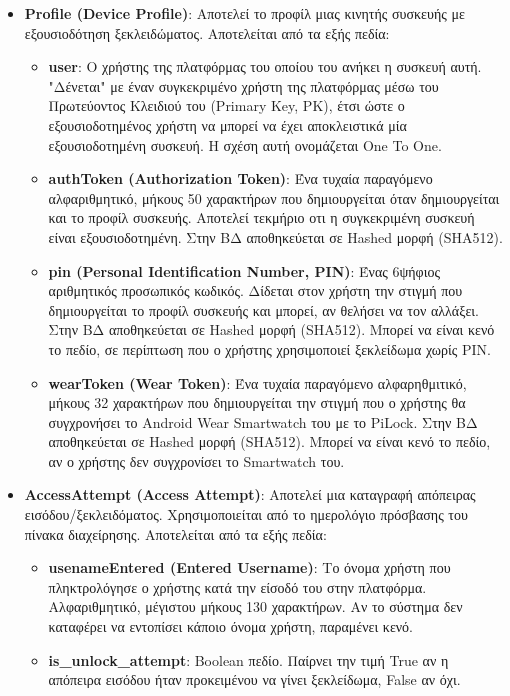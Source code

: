 	\begin{itemize}
		\item \textbf{Profile (Device Profile)}: Αποτελεί το προφίλ μιας κινητής συσκευής με εξουσιοδότηση ξεκλειδώματος. Αποτελείται από τα εξής πεδία:
		\begin{itemize}
			\item \textbf{user}: Ο χρήστης της πλατφόρμας του οποίου του ανήκει η συσκευή αυτή. "Δένεται" με έναν συγκεκριμένο χρήστη της πλατφόρμας μέσω του Πρωτεύοντος Κλειδιού του (Primary Key, PK), έτσι ώστε ο εξουσιοδοτημένος χρήστη να μπορεί να έχει αποκλειστικά μία εξουσιοδοτημένη συσκευή. Η σχέση αυτή ονομάζεται One To One.
			\item \textbf{authToken (Authorization Token)}: Ένα τυχαία παραγόμενο αλφαριθμητικό, μήκους 50 χαρακτήρων που δημιουργείται όταν δημιουργείται και το προφίλ συσκευής. Αποτελεί τεκμήριο οτι η συγκεκριμένη συσκευή είναι εξουσιοδοτημένη. Στην ΒΔ αποθηκεύεται σε Hashed μορφή (SHA512). 
			\item \textbf{pin (Personal Identification Number, PIN)}: Ένας 6ψήφιος αριθμητικός προσωπικός κωδικός. Δίδεται στον χρήστη την στιγμή που δημιουργείται το προφίλ συσκευής και μπορεί, αν θελήσει να τον αλλάξει. Στην ΒΔ αποθηκεύεται σε Hashed μορφή (SHA512). Μπορεί να είναι κενό το πεδίο, σε περίπτωση που ο χρήστης χρησιμοποιεί ξεκλείδωμα χωρίς PIN.
			\item \textbf{wearToken (Wear Token)}: Ένα τυχαία παραγόμενο αλφαρηθμιτικό, μήκους 32 χαρακτήρων που δημιουργείται την στιγμή που ο χρήστης θα συγχρονήσει το Android Wear Smartwatch του με το PiLock. Στην ΒΔ αποθηκεύεται σε Hashed μορφή (SHA512). Μπορεί να είναι κενό το πεδίο, αν ο χρήστης δεν συγχρονίσει το Smartwatch του.
		\end{itemize}
		\item \textbf{AccessAttempt (Access Attempt)}: Αποτελεί μια καταγραφή απόπειρας εισόδου/ξεκλειδόματος. Χρησιμοποιείται από το ημερολόγιο πρόσβασης του πίνακα διαχείρησης. Αποτελείται από τα εξής πεδία:
		\begin{itemize}
			\item \textbf{usenameEntered (Entered Username)}: Το όνομα χρήστη που πληκτρολόγησε ο χρήστης κατά την είσοδό του στην πλατφόρμα. Αλφαριθμητικό, μέγιστου μήκους 130 χαρακτήρων. Αν το σύστημα δεν καταφέρει να εντοπίσει κάποιο όνομα χρήστη, παραμένει κενό.
			\item \textbf{is\_unlock\_attempt}: Boolean πεδίο. Παίρνει την τιμή True αν η απόπειρα εισόδου ήταν προκειμένου να γίνει ξεκλείδωμα, False αν όχι.

\end{itemize}
\end{itemize}
